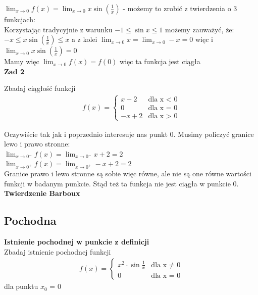 \documentclass[12pt]{article}
\begin{document}
	\noindent $\lim_{x \to 0} f(x) = \lim_{x \to 0} x \sin(\frac{1}{x})$ - możemy to zrobić z twierdzenia o 3 funkcjach: \\

	\noindent Korzystając tradycyjnie z warunku $-1 \leq \sin{x} \leq 1$ możemy zauważyć, że: \\

	\noindent $-x \leq x \sin(\frac{1}{x}) \leq x$ a z kolei $\lim_{x \to 0} x = \lim_{x \to 0} -x = 0$ więc i $\lim_{x \to 0} x \sin(\frac{1}{x}) = 0$ \\

	\noindent Mamy więc $\lim_{x \to 0} f(x) = f(0)$ więc ta funkcja jest ciągła \\


	\noindent \textbf{Zad 2}

	\noindent Zbadaj ciągłość funkcji \begin{align*} f(x) =
																		\begin{cases}
																			x + 2 & \text{dla x $<$ 0} \\
																			0 & \text{dla x = 0} \\
																			-x + 2 & \text{dla x $>$ 0}
																		\end{cases}
															\end{align*}

	\noindent Oczywiście tak jak i poprzednio interesuje nas punkt 0. Musimy policzyć granice lewo i prawo stronne: \\

	\noindent $\lim_{x \to 0^{-}} f(x) = \lim_{x \to 0^{-}} x + 2 = 2$ \\
	\noindent $\lim_{x \to 0^{+}} f(x) = \lim_{x \to 0^{+}} -x + 2 = 2$ \\

	\noindent Granice prawo i lewo stronne są sobie więc równe, ale nie są one równe wartości funkcji w badanym punkcie.
						Stąd też ta funkcja nie jest ciągła w punkcie 0. \\


	\noindent \textbf{Twierdzenie Barboux}


	\subsection{Pochodna}

	\textbf{Istnienie pochodnej w punkcie z definicji} \\

	\noindent Zbadaj istnienie pochodnej funkcji \begin{align*} f(x) = 
																					\begin{cases}
																						x^2 \cdot \sin{\frac{1}{x}} & \text{dla x $\neq$ 0} \\
																						0 & \text{dla x = 0}
																					\end{cases}
																				\end{align*}
	dla punktu $x_{0}$ = 0
\end{document}
